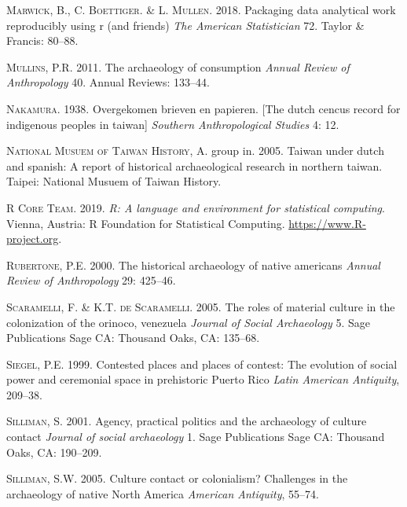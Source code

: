 \documentclass[]{article}
\begin{document}
\leavevmode\hypertarget{ref-Marwick2018}{}%
\textsc{Marwick}, B., C. \textsc{Boettiger}. \& L. \textsc{Mullen}.
2018. Packaging data analytical work reproducibly using r (and friends)
\emph{The American Statistician} 72. Taylor \& Francis: 80--88.

\leavevmode\hypertarget{ref-Mullins2011}{}%
\textsc{Mullins}, P.R. 2011. The archaeology of consumption \emph{Annual
Review of Anthropology} 40. Annual Reviews: 133--44.

\leavevmode\hypertarget{ref-Nakamura1938}{}%
\textsc{Nakamura}. 1938. Overgekomen brieven en papieren. {[}The dutch
cencus record for indigenous peoples in taiwan{]} \emph{Southern
Anthropological Studies} 4: 12.

\leavevmode\hypertarget{ref-NMTH2005}{}%
\textsc{National Musuem of Taiwan History}, A. group in. 2005. Taiwan
under dutch and spanish: A report of historical archaeological research
in northern taiwan. Taipei: National Musuem of Taiwan History.

\leavevmode\hypertarget{ref-Rlanguage2019}{}%
\textsc{R Core Team}. 2019. \emph{R: A language and environment for
statistical computing}. Vienna, Austria: R Foundation for Statistical
Computing. \url{https://www.R-project.org}.

\leavevmode\hypertarget{ref-Rubertone2000}{}%
\textsc{Rubertone}, P.E. 2000. The historical archaeology of native
americans \emph{Annual Review of Anthropology} 29: 425--46.

\leavevmode\hypertarget{ref-Scaramelli2005}{}%
\textsc{Scaramelli}, F. \& K.T. \textsc{de Scaramelli}. 2005. The roles
of material culture in the colonization of the orinoco, venezuela
\emph{Journal of Social Archaeology} 5. Sage Publications Sage CA:
Thousand Oaks, CA: 135--68.

\leavevmode\hypertarget{ref-Siegel1999}{}%
\textsc{Siegel}, P.E. 1999. Contested places and places of contest: The
evolution of social power and ceremonial space in prehistoric Puerto
Rico \emph{Latin American Antiquity}, 209--38.

\leavevmode\hypertarget{ref-Silliman2001}{}%
\textsc{Silliman}, S. 2001. Agency, practical politics and the
archaeology of culture contact \emph{Journal of social archaeology} 1.
Sage Publications Sage CA: Thousand Oaks, CA: 190--209.

\leavevmode\hypertarget{ref-Silliman2005}{}%
\textsc{Silliman}, S.W. 2005. Culture contact or colonialism? Challenges
in the archaeology of native North America \emph{American Antiquity},
55--74.
\end{document}
